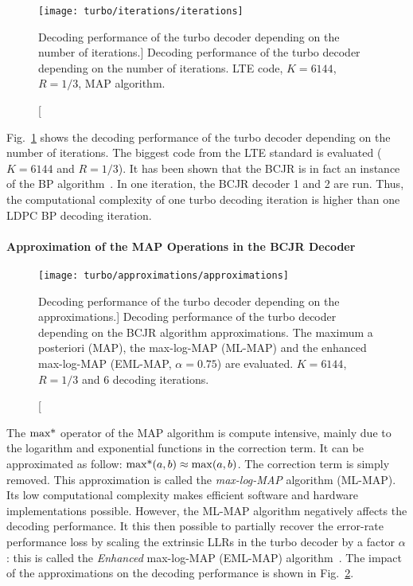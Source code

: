 \begin{figure}[htp]
  \centering
  \texttt{[image: turbo/iterations/iterations]}
  \caption
    [Decoding performance of the turbo decoder depending on the number of
     iterations.]
    {Decoding performance of the turbo decoder depending on the number of
     iterations. LTE code, $K = 6144$, $R = 1/3$, MAP algorithm.}
  \label{plot:alg_turbo_iterations}
\end{figure}

Fig.~\ref{plot:alg_turbo_iterations} shows the decoding performance of the turbo
decoder depending on the number of iterations. The biggest code from the
LTE standard is evaluated ($K = 6144$ and $R=1/3$). It has been shown that the
BCJR is in fact an instance of the BP algorithm~\cite{McEliece1998}. In one
iteration, the BCJR decoder 1 and 2 are run. Thus, the computational complexity
of one turbo decoding iteration is higher than one LDPC BP decoding iteration.

\paragraph{Approximation of the MAP Operations in the BCJR Decoder}

\begin{figure}[htp]
  \centering
  \texttt{[image: turbo/approximations/approximations]}
  \caption
    [Decoding performance of the turbo decoder depending on the approximations.]
    {Decoding performance of the turbo decoder depending on the BCJR algorithm
     approximations. The maximum a posteriori (MAP), the max-log-MAP (ML-MAP)
     and the enhanced max-log-MAP (EML-MAP, $\alpha = 0.75$) are evaluated.
     $K = 6144$, $R=1/3$ and 6 decoding iterations.}
  \label{plot:alg_turbo_approximations}
\end{figure}

The $\operatorname*{max*}$ operator of the MAP algorithm is compute intensive, mainly due to
the logarithm and exponential functions in the correction term. It can be
approximated as follow: $\operatorname*{max*}(a,b) \approx \max(a,b)$. The correction term
is simply removed. This approximation is called the \emph{max-log-MAP} algorithm
(ML-MAP). Its low computational complexity makes efficient software and hardware
implementations possible. However, the ML-MAP algorithm negatively affects the
decoding performance. It this then possible to partially recover the error-rate
performance loss by scaling the extrinsic LLRs in the turbo decoder by a factor
$\alpha$: this is called the \emph{Enhanced} max-log-MAP (EML-MAP)
algorithm~\cite{Vogt2000,Studer2011}. The impact of the approximations on the
decoding performance is shown in Fig.~\ref{plot:alg_turbo_approximations}.

